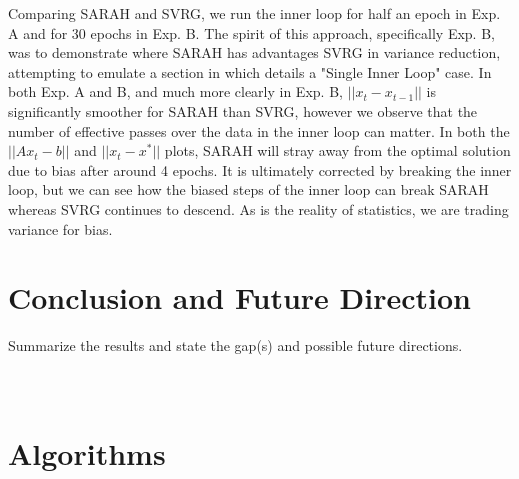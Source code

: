 \documentclass[letterpaper,11 pt]{article}
\begin{document}
Comparing SARAH and SVRG, we run the inner loop for half an epoch  in Exp. A and for 30 epochs in Exp. B.  The spirit of this approach, specifically Exp. B, was to demonstrate where SARAH has advantages SVRG in variance reduction, attempting to emulate a section in \cite{nguyen} which details a "Single Inner Loop" case. In both Exp. A and B, and much more clearly in Exp. B, $||x_t - x_{t-1}||$ is significantly smoother for SARAH than SVRG, however we observe that the number of effective passes over the data in the inner loop can matter. In both the $||Ax_t-b||$ and $||x_t-x^*||$ plots, SARAH will stray away from the optimal solution due to bias after around 4 epochs.  It is ultimately corrected by breaking the inner loop, but we can see how the biased steps of the inner loop can break SARAH whereas SVRG continues to descend. As is the reality of statistics, we are trading variance for bias.


\section{Conclusion and Future Direction}
Summarize the results and state the gap(s) and possible future directions.



\appendix
\section{\\Algorithms}

    
 
\end{document}
